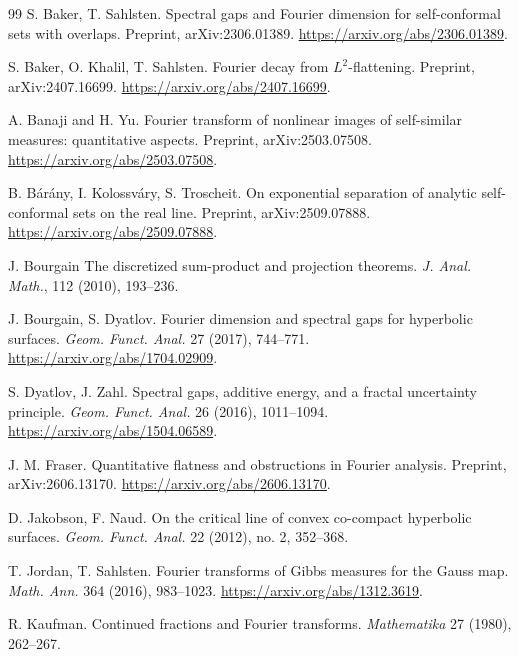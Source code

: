 \documentclass[12pt]{amsart}
\theoremstyle{definition}
\begin{document}
\begin{thebibliography}{99}
S. Baker, T. Sahlsten.
\newblock Spectral gaps and Fourier dimension for self-conformal sets with overlaps.
\newblock Preprint, arXiv:2306.01389.
\newblock \url{https://arxiv.org/abs/2306.01389}.

S. Baker, O. Khalil, T. Sahlsten.
\newblock Fourier decay from \(L^2\)-flattening.
\newblock Preprint, arXiv:2407.16699.
\newblock \url{https://arxiv.org/abs/2407.16699}.

A. Banaji and H. Yu.
\newblock Fourier transform of nonlinear images of self-similar measures: quantitative aspects.
\newblock Preprint, arXiv:2503.07508.
\newblock \url{https://arxiv.org/abs/2503.07508}.

B. B\'ar\'any, I. Kolossv\'ary, S. Troscheit.
\newblock On exponential separation of analytic self-conformal sets on the real line.
\newblock Preprint, arXiv:2509.07888.
\newblock \url{https://arxiv.org/abs/2509.07888}.

J. Bourgain
\newblock The discretized sum-product and projection theorems.
\newblock \emph{J. Anal. Math.}, 112 (2010), 193--236.

J. Bourgain, S. Dyatlov.
\newblock Fourier dimension and spectral gaps for hyperbolic surfaces.
\newblock \emph{Geom. Funct. Anal.} 27 (2017), 744--771.
\newblock \url{https://arxiv.org/abs/1704.02909}.

S. Dyatlov, J. Zahl.
\newblock Spectral gaps, additive energy, and a fractal uncertainty principle.
\newblock \emph{Geom. Funct. Anal.} 26 (2016), 1011--1094.
\newblock \url{https://arxiv.org/abs/1504.06589}.

J. M. Fraser.
\newblock Quantitative flatness and obstructions in Fourier analysis.
\newblock Preprint, arXiv:2606.13170.
\newblock \url{https://arxiv.org/abs/2606.13170}.

D. Jakobson, F. Naud.
\newblock On the critical line of convex co-compact hyperbolic surfaces.
\newblock \emph{Geom. Funct. Anal.} 22 (2012), no. 2, 352--368.

T. Jordan, T. Sahlsten.
\newblock Fourier transforms of Gibbs measures for the Gauss map.
\newblock \emph{Math. Ann.} 364 (2016), 983--1023.
\newblock \url{https://arxiv.org/abs/1312.3619}.

R. Kaufman.
\newblock Continued fractions and Fourier transforms.
\newblock \emph{Mathematika} 27 (1980), 262--267.


\end{thebibliography}
\end{document}
